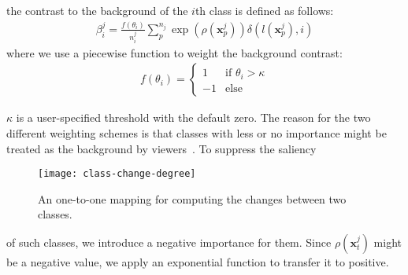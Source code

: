 the contrast to the background of the $i$th class is defined as follows:
\begin{align}\label{eq:ctbc}
 \beta^j_i = \frac{f(\theta_i)}{n^j_i}\sum^{n_j}_{p} \exp(\rho(\mathbf{x}^j_p)) \delta(l(\mathbf{x}^j_p),i)
\end{align}
where we use a piecewise function to weight the background contrast:
\begin{align}
f(\theta_i) =  \left\{ \begin{array}{ll}
1 & \textrm{if $\theta_i>\kappa$}\\
-1 & \textrm{else}
\end{array} \right.
\label{eq:piecewiseFunc}
\end{align}

$\kappa$ is a user-specified threshold with the default zero. The reason for the two different weighting schemes is that classes with less or no importance might be treated as the background by viewers~\cite{zhang2018review}. To suppress the saliency
\begin{wrapfigure}{r}{0.28\columnwidth}
	\vspace{-5mm}
	\centering
	\texttt{[image: class-change-degree]}
	\vspace*{-8mm}
	\caption{An one-to-one mapping for computing the changes between two classes.}
	\vspace*{-2mm}
	\label{fig:class-change-degree}
\end{wrapfigure}
 of such classes, we introduce a negative importance for them. Since $\rho (\mathbf{x}^j_t)$ might be a negative value, we apply an exponential function to transfer it to positive.


